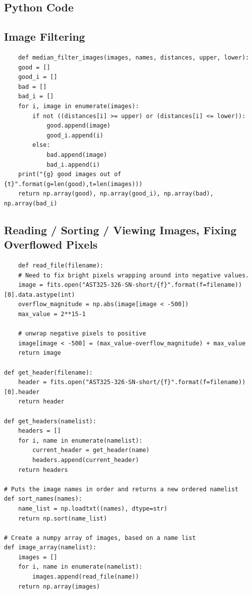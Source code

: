 \documentclass{article}
\begin{document}
\begin{appendices}
\section{Python Code}
\subsection{Image Filtering}
\begin{verbatim}
    def median_filter_images(images, names, distances, upper, lower):
    good = []
    good_i = []
    bad = []
    bad_i = []
    for i, image in enumerate(images):
        if not ((distances[i] >= upper) or (distances[i] <= lower)):
            good.append(image)
            good_i.append(i)
        else:
            bad.append(image)
            bad_i.append(i)
    print("{g} good images out of {t}".format(g=len(good),t=len(images)))
    return np.array(good), np.array(good_i), np.array(bad), np.array(bad_i)   
\end{verbatim}

\subsection{Reading / Sorting / Viewing Images, Fixing Overflowed Pixels}

\begin{verbatim}
    def read_file(filename):
    # Need to fix bright pixels wrapping around into negative values.
    image = fits.open("AST325-326-SN-short/{f}".format(f=filename))[0].data.astype(int)
    overflow_magnitude = np.abs(image[image < -500])
    max_value = 2**15-1
    
    # unwrap negative pixels to positive
    image[image < -500] = (max_value-overflow_magnitude) + max_value
    return image

def get_header(filename):
    header = fits.open("AST325-326-SN-short/{f}".format(f=filename))[0].header
    return header

def get_headers(namelist):
    headers = []
    for i, name in enumerate(namelist):
        current_header = get_header(name)
        headers.append(current_header)
    return headers

# Puts the image names in order and returns a new ordered namelist
def sort_names(names):
    name_list = np.loadtxt((names), dtype=str)
    return np.sort(name_list)

# Create a numpy array of images, based on a name list
def image_array(namelist):
    images = []
    for i, name in enumerate(namelist):
        images.append(read_file(name))
    return np.array(images)
    

\end{verbatim}
\end{appendices}
\end{document}

